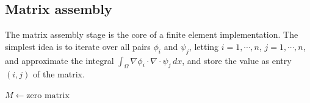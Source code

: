 \subsection{Matrix assembly}
The matrix assembly stage is the core of a finite element implementation. The simplest idea is to iterate over all pairs $\phi_i$ and $\psi_j$,
letting $i=1,\cdots,n$, $j = 1,\cdots,n$, and approximate the integral $\int_\Omega \nabla\phi_i\cdot \nabla\cdot \psi_j\,dx$,
and store the value as entry $(i,j)$ of the matrix.
\begin{algorithm}
    \SetAlgoLined
    $M \leftarrow \text{zero matrix}$\;
\end{algorithm}

\begin{algorithm}
    \SetAlgoLined
\end{algorithm}


